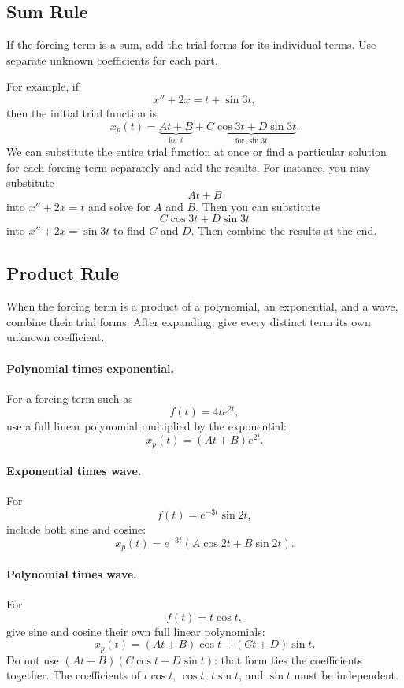 \documentclass[10pt,letterpaper]{article}
\begin{document}
\subsection{Sum Rule}

If the forcing term is a sum, add the trial forms for its
individual terms. Use separate unknown coefficients for
each part.

For example, if
\[
x''+2x=t+\sin 3t,
\]
then the initial trial function is
\[
x_p(t)=
\underbrace{At+B}_{\text{for }t}
+
\underbrace{C\cos 3t+D\sin 3t}_{\text{for }\sin 3t}.
\]
We can substitute the entire trial function at once or
find a particular solution for each forcing term separately
and add the results. For instance, you may substitute 
$$
At+B
$$
into $x''+2x=t$ and solve for $A$ and $B$. Then you can 
substitute
$$
C\cos3t+D\sin3t
$$
into $x''+2x=\sin3t$ to find $C$ and $D$. Then combine the results at the end.
\subsection{Product Rule}

When the forcing term is a product of a polynomial, an
exponential, and a wave, combine their trial forms.
After expanding, give every distinct term its own
unknown coefficient.

\paragraph{Polynomial times exponential.}
For a forcing term such as
\[
f(t)=4te^{2t},
\]
use a full linear polynomial multiplied by the exponential:
\[
x_p(t)=(At+B)e^{2t}.
\]

\paragraph{Exponential times wave.}
For
\[
f(t)=e^{-3t}\sin 2t,
\]
include both sine and cosine:
\[
x_p(t)=e^{-3t}(A\cos 2t+B\sin 2t).
\]

\paragraph{Polynomial times wave.}
For
\[
f(t)=t\cos t,
\]
give sine and cosine their own full linear polynomials:
\[
x_p(t)=(At+B)\cos t+(Ct+D)\sin t.
\]
Do not use $(At+B)(C\cos t+D\sin t)$: that form ties
the coefficients together. The coefficients of
$t\cos t$, $\cos t$, $t\sin t$, and $\sin t$
must be independent.
\end{document}
